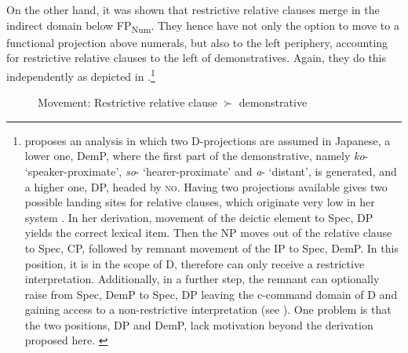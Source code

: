 \largerpage[-2.5]
On the other hand, it was shown that restrictive relative clauses merge in the indirect domain below FP\textsubscript{Num}. They hence have not only the option to move to a functional projection above numerals, but also to the left periphery, accounting for restrictive relative clauses to the left of demonstratives. Again, they do this independently as depicted in .\footnote{\citet{ishizuka:2008:RC} proposes an analysis in which two D-projections are assumed in Japanese, a lower one, DemP, where the first part of the demonstrative, namely \textit{ko}- `speaker-proximate', \textit{so}- `hearer-proximate' and \textit{a}- `distant', is generated, and a higher one, DP, headed by \textsc{no}. Having two projections available gives two possible landing sites for relative clauses, which originate very low in her system \citep{kayne:1994:anti}. In her derivation, movement of the deictic element to Spec, DP yields the correct lexical item. Then the NP moves out of the relative clause to Spec, CP, followed by remnant movement of the IP to Spec, DemP. In this position, it is in the scope of D, therefore can only receive a restrictive interpretation. Additionally, in a further step, the remnant can optionally raise from Spec, DemP to Spec, DP leaving the c-command domain of D and gaining access to a non-restrictive interpretation (see \citealt[8–9]{ishizuka:2008:RC}). One problem is that the two positions, DP and DemP, lack motivation beyond the derivation proposed here. \label{footnote ishizuka}}

\begin{figure}
\centering
{}
\caption{Movement: Restrictive relative clause $\succ$ demonstrative}
\label{restrictive rc - dem}
\end{figure}

